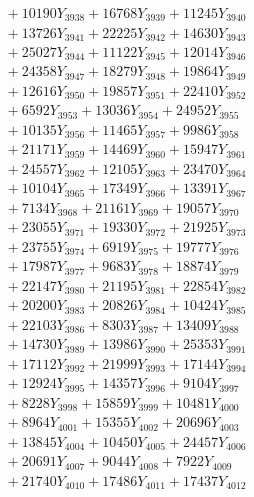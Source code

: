 \documentclass[a4paper,10pt]{article}
\begin{document}
{\begin{align}
&\;  + 10190 Y_{3938} + 16768 Y_{3939} + 11245 Y_{3940} \\[0.3ex]
&\;  + 13726 Y_{3941} + 22225 Y_{3942} + 14630 Y_{3943} \\[0.3ex]
&\;  + 25027 Y_{3944} + 11122 Y_{3945} + 12014 Y_{3946} \\[0.3ex]
&\;  + 24358 Y_{3947} + 18279 Y_{3948} + 19864 Y_{3949} \\[0.3ex]
&\;  + 12616 Y_{3950} + 19857 Y_{3951} + 22410 Y_{3952} \\[0.3ex]
&\;  + 6592 Y_{3953} + 13036 Y_{3954} + 24952 Y_{3955} \\[0.3ex]
&\;  + 10135 Y_{3956} + 11465 Y_{3957} + 9986 Y_{3958} \\[0.5ex]\allowbreak
&\;  + 21171 Y_{3959} + 14469 Y_{3960} + 15947 Y_{3961} \\[0.3ex]
&\;  + 24557 Y_{3962} + 12105 Y_{3963} + 23470 Y_{3964} \\[0.3ex]
&\;  + 10104 Y_{3965} + 17349 Y_{3966} + 13391 Y_{3967} \\[0.3ex]
&\;  + 7134 Y_{3968} + 21161 Y_{3969} + 19057 Y_{3970} \\[0.3ex]
&\;  + 23055 Y_{3971} + 19330 Y_{3972} + 21925 Y_{3973} \\[0.3ex]
&\;  + 23755 Y_{3974} + 6919 Y_{3975} + 19777 Y_{3976} \\[0.3ex]
&\;  + 17987 Y_{3977} + 9683 Y_{3978} + 18874 Y_{3979} \\[0.3ex]
&\;  + 22147 Y_{3980} + 21195 Y_{3981} + 22854 Y_{3982} \\[0.3ex]
&\;  + 20200 Y_{3983} + 20826 Y_{3984} + 10424 Y_{3985} \\[0.3ex]
&\;  + 22103 Y_{3986} + 8303 Y_{3987} + 13409 Y_{3988} \\[0.5ex]\allowbreak
&\;  + 14730 Y_{3989} + 13986 Y_{3990} + 25353 Y_{3991} \\[0.3ex]
&\;  + 17112 Y_{3992} + 21999 Y_{3993} + 17144 Y_{3994} \\[0.3ex]
&\;  + 12924 Y_{3995} + 14357 Y_{3996} + 9104 Y_{3997} \\[0.3ex]
&\;  + 8228 Y_{3998} + 15859 Y_{3999} + 10481 Y_{4000} \\[0.3ex]
&\;  + 8964 Y_{4001} + 15355 Y_{4002} + 20696 Y_{4003} \\[0.3ex]
&\;  + 13845 Y_{4004} + 10450 Y_{4005} + 24457 Y_{4006} \\[0.3ex]
&\;  + 20691 Y_{4007} + 9044 Y_{4008} + 7922 Y_{4009} \\[0.3ex]
&\;  + 21740 Y_{4010} + 17486 Y_{4011} + 17437 Y_{4012} \\[0.3ex]

\end{align}}
\end{document}
